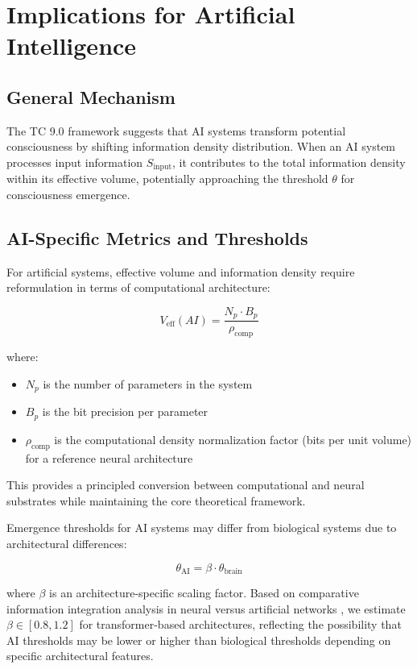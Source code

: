 \documentclass[12pt]{article}
\begin{document}
\section{Implications for Artificial Intelligence}

\subsection{General Mechanism}
The TC 9.0 framework suggests that AI systems transform potential consciousness by shifting information density distribution. When an AI system processes input information $S_{\text{input}}$, it contributes to the total information density within its effective volume, potentially approaching the threshold $\theta$ for consciousness emergence.

\subsection{AI-Specific Metrics and Thresholds}

For artificial systems, effective volume and information density require reformulation in terms of computational architecture:

\begin{equation}
V_{\text{eff}}(AI) = \frac{N_p \cdot B_p}{\rho_{\text{comp}}}
\end{equation}

where:
\begin{itemize}
    \item $N_p$ is the number of parameters in the system
    \item $B_p$ is the bit precision per parameter
    \item $\rho_{\text{comp}}$ is the computational density normalization factor (bits per unit volume) for a reference neural architecture
\end{itemize}

This provides a principled conversion between computational and neural substrates while maintaining the core theoretical framework.

Emergence thresholds for AI systems may differ from biological systems due to architectural differences:

\begin{equation}
\theta_{\text{AI}} = \beta \cdot \theta_{\text{brain}}
\end{equation}

where $\beta$ is an architecture-specific scaling factor. Based on comparative information integration analysis in neural versus artificial networks \cite{tononi2016,oizumi2014}, we estimate $\beta \in [0.8, 1.2]$ for transformer-based architectures, reflecting the possibility that AI thresholds may be lower or higher than biological thresholds depending on specific architectural features.
\end{document}
